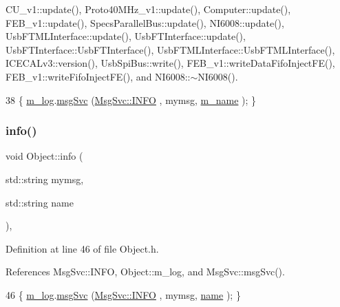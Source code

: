 C\+U\+\_\+v1\+::update(), Proto40\+M\+Hz\+\_\+v1\+::update(), Computer\+::update(), F\+E\+B\+\_\+v1\+::update(), Specs\+Parallel\+Bus\+::update(), N\+I6008\+::update(), Usb\+F\+T\+M\+L\+Interface\+::update(), Usb\+F\+T\+Interface\+::update(), Usb\+F\+T\+Interface\+::\+Usb\+F\+T\+Interface(), Usb\+F\+T\+M\+L\+Interface\+::\+Usb\+F\+T\+M\+L\+Interface(), I\+C\+E\+C\+A\+Lv3\+::version(), Usb\+Spi\+Bus\+::write(), F\+E\+B\+\_\+v1\+::write\+Data\+Fifo\+Inject\+F\+E(), F\+E\+B\+\_\+v1\+::write\+Fifo\+Inject\+F\+E(), and N\+I6008\+::$\sim$\+N\+I6008().


\begin{DoxyCode}
38 \{ \hyperlink{classObject_a0d269813dd7ac1f24bc143031e2963f2}{m\_log}.\hyperlink{classMsgSvc_ad25f18047920cc59a314e5098259711c}{msgSvc} (\hyperlink{classMsgSvc_ae671eb7301996cd049d2da8a65925926ad2fcf3f3e734fc41ee097cc23670ce51}{MsgSvc::INFO}    , mymsg, \hyperlink{classObject_a8b83c95c705d2c3ba0d081fe1710f48d}{m\_name} ); \}
\end{DoxyCode}
\mbox{\label{classObject_a1ca123253dfd30fc28b156f521dcbdae}} 
\subsubsection{\texorpdfstring{info()}{info()}\hspace{0.1cm}{\footnotesize\ttfamily [2/2]}}
{\footnotesize\ttfamily void Object\+::info (\begin{DoxyParamCaption}\item[{std\+::string}]{mymsg,  }\item[{std\+::string}]{name }\end{DoxyParamCaption})\hspace{0.3cm}{\ttfamily [inline]}, {\ttfamily [inherited]}}



Definition at line 46 of file Object.\+h.



References Msg\+Svc\+::\+I\+N\+FO, Object\+::m\+\_\+log, and Msg\+Svc\+::msg\+Svc().


\begin{DoxyCode}
46 \{ \hyperlink{classObject_a0d269813dd7ac1f24bc143031e2963f2}{m\_log}.\hyperlink{classMsgSvc_ad25f18047920cc59a314e5098259711c}{msgSvc} (\hyperlink{classMsgSvc_ae671eb7301996cd049d2da8a65925926ad2fcf3f3e734fc41ee097cc23670ce51}{MsgSvc::INFO}    , mymsg, \hyperlink{classObject_a300f4c05dd468c7bb8b3c968868443c1}{name} ); \}
\end{DoxyCode}
\mbox{\label{classA3PE__BitFlip_a88dc6cfe690a518e38ff6d89026e6e0c}} 
